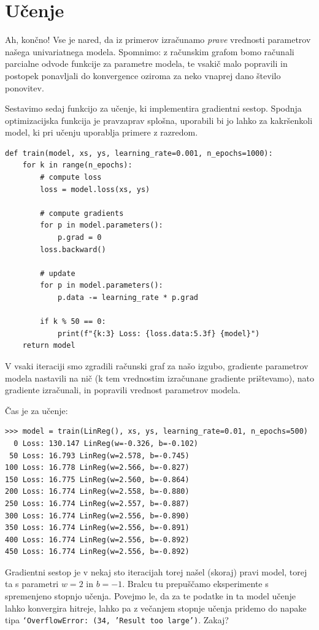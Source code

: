 \section{Učenje}

Ah, končno! Vse je nared, da iz primerov izračunamo {\em prave} vrednosti parametrov našega univariatnega modela. Spomnimo: z računskim grafom bomo računali parcialne odvode funkcije za parametre modela, te vsakič malo popravili in postopek ponavljali do konvergence oziroma za neko vnaprej dano število ponovitev.

Sestavimo sedaj funkcijo za učenje, ki implementira gradientni sestop. Spodnja optimizacijska funkcija je pravzaprav splošna, uporabili bi jo lahko za kakršenkoli model, ki pri učenju uporablja primere z razredom.

\vspace*{3mm}
\begin{lstlisting}
def train(model, xs, ys, learning_rate=0.001, n_epochs=1000):
    for k in range(n_epochs):
        # compute loss
        loss = model.loss(xs, ys)

        # compute gradients
        for p in model.parameters():
            p.grad = 0
        loss.backward()

        # update
        for p in model.parameters():
            p.data -= learning_rate * p.grad

        if k % 50 == 0:
            print(f"{k:3} Loss: {loss.data:5.3f} {model}")
    return model
\end{lstlisting}
%
V vsaki iteraciji smo zgradili računski graf za našo izgubo, gradiente parametrov modela nastavili na nič (k tem vrednostim izračunane gradiente prištevamo), nato gradiente izračunali, in popravili vrednost parametrov modela.

Čas je za učenje:

\vspace*{3mm}
\begin{lstlisting}
>>> model = train(LinReg(), xs, ys, learning_rate=0.01, n_epochs=500)
  0 Loss: 130.147 LinReg(w=-0.326, b=-0.102)
 50 Loss: 16.793 LinReg(w=2.578, b=-0.745)
100 Loss: 16.778 LinReg(w=2.566, b=-0.827)
150 Loss: 16.775 LinReg(w=2.560, b=-0.864)
200 Loss: 16.774 LinReg(w=2.558, b=-0.880)
250 Loss: 16.774 LinReg(w=2.557, b=-0.887)
300 Loss: 16.774 LinReg(w=2.556, b=-0.890)
350 Loss: 16.774 LinReg(w=2.556, b=-0.891)
400 Loss: 16.774 LinReg(w=2.556, b=-0.892)
450 Loss: 16.774 LinReg(w=2.556, b=-0.892)
\end{lstlisting}
%
Gradientni sestop je v nekaj sto iteracijah torej našel (skoraj) pravi model, torej ta s parametri \( w=2 \) in \( b=-1 \). Bralcu tu prepuščamo eksperimente s spremenjeno stopnjo učenja. Povejmo le, da za te podatke in ta model učenje lahko konvergira hitreje, lahko pa z večanjem stopnje učenja pridemo do napake tipa \texttt{`OverflowError: (34, 'Result too large')}. Zakaj?

